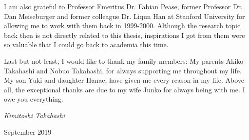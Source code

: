 I am also grateful to Professor Emeritus Dr. Fabian Pease, former Professor Dr. Dan Meiseburger and former colleague Dr. Liqun Han at Stanford University for allowing me to work with them back in 1999-2000.
Although the research topic back then is not directly related to this thesis, inspirations I got from them were so valuable that I could go back to academia this time.



Last but not least, I would like to thank my family members: My parents Akiko Takahashi and Nobuo Takahashi, for always supporting me throughout my life.
My son Yuki and daughter Hanae, have given me every reason in my life.
Above all, the exceptional thanks are due to my wife Junko for always being with me. I owe you everything.


\begin{flushright}
{\em\Large Kimitoshi Takahashi \par\bigskip September 2019}
\end{flushright}





